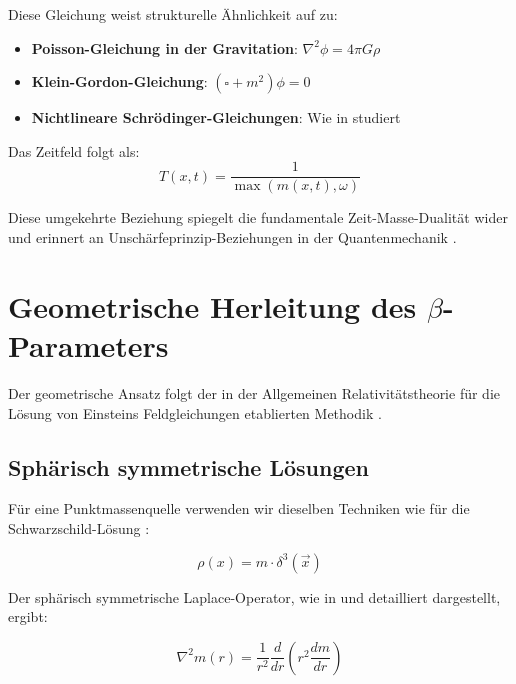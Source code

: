 \documentclass[12pt,a4paper]{article}
\newcommand{\vecx}{\vec{x}}
\begin{document}
	Diese Gleichung weist strukturelle Ähnlichkeit auf zu:
	\begin{itemize}
		\item \textbf{Poisson-Gleichung in der Gravitation}: $\nabla^2 \phi = 4\pi G \rho$ \citep{jackson1998}
		\item \textbf{Klein-Gordon-Gleichung}: $(\square + m^2)\phi = 0$ \citep{peskin1995}
		\item \textbf{Nichtlineare Schrödinger-Gleichungen}: Wie in \citep{sulem1999} studiert
	\end{itemize}
	
	Das Zeitfeld folgt als:
	\begin{equation}
		\label{eq:time_field_definition}
		T(x,t) = \frac{1}{\max(m(x,t), \omega)}
	\end{equation}
	
	Diese umgekehrte Beziehung spiegelt die fundamentale Zeit-Masse-Dualität wider und erinnert an Unschärfeprinzip-Beziehungen in der Quantenmechanik \citep{heisenberg1927,griffiths2004}.
	
	\section{Geometrische Herleitung des $\beta$-Parameters}
	\label{sec:beta_derivation}
	
	Der geometrische Ansatz folgt der in der Allgemeinen Relativitätstheorie für die Lösung von Einsteins Feldgleichungen etablierten Methodik \citep{schwarzschild1916,misner1973,carroll2004}.
	
	\subsection{Sphärisch symmetrische Lösungen}
	\label{subsec:spherical_solutions}
	
	Für eine Punktmassenquelle verwenden wir dieselben Techniken wie für die Schwarzschild-Lösung \citep{schwarzschild1916,weinberg1972}:
	
	\begin{equation}
		\rho(x) = m \cdot \delta^3(\vecx)
	\end{equation}
	
	Der sphärisch symmetrische Laplace-Operator, wie in \citet{jackson1998} und \citet{griffiths1999} detailliert dargestellt, ergibt:
	
	\begin{equation}
		\nabla^2 m(r) = \frac{1}{r^2}\frac{d}{dr}\left(r^2 \frac{dm}{dr}\right)
	\end{equation}
	
\end{document}
